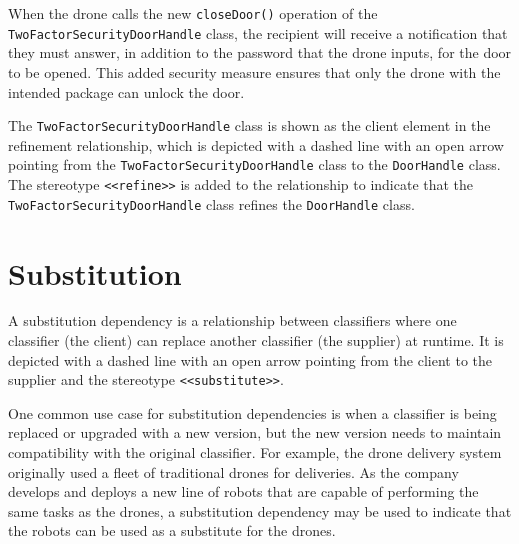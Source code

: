 \documentclass[
	12pt,
    a4paper,
    egregdoesnotlikesansseriftitles, %
    toc=chapterentrywithdots,
    oneside, openany,
    titlepage,
    parskip=half,
    headings=normal,  %
    listof=totoc,
    bibliography=totocnumbered,
    index=totoc,
    captions=tableheading,  %
    listof=flat,
    numbers=noenddot, %
    final]
    {scrbook}
\begin{document}
When the drone calls the new \texttt{closeDoor()} operation of the \texttt{TwoFactorSecurityDoorHandle} class, the recipient will receive a notification that they must answer, in addition to the password that the drone inputs, for the door to be opened. This added security measure ensures that only the drone with the intended package can unlock the door.

The \texttt{TwoFactorSecurityDoorHandle} class is shown as the client element in the refinement relationship, which is depicted with a dashed line with an open arrow pointing from the \texttt{TwoFactorSecurityDoorHandle} class to the \texttt{DoorHandle} class. The stereotype \texttt{<<refine>>} is added to the relationship to indicate that the \texttt{TwoFactorSecurityDoorHandle} class refines the \texttt{DoorHandle} class.

\section{Substitution}

A substitution dependency is a relationship between classifiers where one classifier (the client) can replace another classifier (the supplier) at runtime. 
It is depicted with a dashed line with an open arrow pointing from the client to the supplier and the stereotype \texttt{<<substitute>>}. \cite[p.165]{uml}


One common use case for substitution dependencies is when a classifier is being replaced or upgraded with a new version, but the new version needs to maintain compatibility with the original classifier. 
For example, the drone delivery system originally used a fleet of traditional drones for deliveries. As the company develops and deploys a new line of robots that are capable of performing the same tasks as the drones, a substitution dependency may be used to indicate that the robots can be used as a substitute for the drones.
\end{document}
